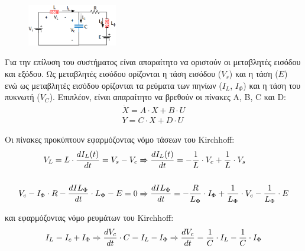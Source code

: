 \begin{figure}[h]
	\centering
	\includegraphics[width=0.35\textwidth]{Images/Phase_1}
\end{figure}

\noindent
Για την επίλυση του συστήματος είναι απαραίτητο να οριστούν οι μεταβλητές εισόδου και εξόδου.  Ως μεταβλητές εισόδου ορίζονται η τάση εισόδου ($V_s$) και η τάση ($E$) ενώ ως μεταβλητές εισόδου ορίζονται τα ρεύματα των πηνίων ($I_L$, $Ι_{\Phi}$) και η τάση του πυκνωτή ($V_C$). Επιπλέον, είναι απαραίτητο να βρεθούν οι πίνακες A, B, C και D:
\begin{align}
	\dot{X} = A\cdot X + B\cdot U \label{x_dot}\\
	Y = C \cdot X + D \cdot U \label{y}
\end{align} 

\noindent
Οι πίνακες προκύπτουν εφαρμόζοντας νόμο τάσεων του Kirchhoff:
\begin{align}
	V_L = L \cdot \frac{dI_L(t)}{dt} = V_s - V_c &\xRightarrow{} \frac{dI_L (t)}{dt} = - \frac{1}{L} \cdot V_c + \frac{1}{L} \cdot V_s\\
	\notag \\
	V_c - I_{\Phi} \cdot R - \frac{dIL_{\Phi}}{dt} \cdot L_{\Phi} - E = 0 &\xRightarrow{}  \frac{dIL_{\Phi}}{dt} = -\frac{R}{L_{\Phi}} \cdot I_{\Phi} + \frac{1}{L_{\Phi}} \cdot V_c - \frac{1}{L_{\Phi}} \cdot E
\end{align}

και εφαρμόζοντας νόμο ρευμάτων του Kirchhoff:
\begin{equation}
	I_L = I_c + I_{\Phi} \xRightarrow{} \frac{dV_c}{dt} \cdot C = I_L - I_{\Phi} \xRightarrow{} \frac{dV_c}{dt} = \frac{1}{C} \cdot I_L - \frac{1}{C} \cdot I_{\Phi}
\end{equation}

